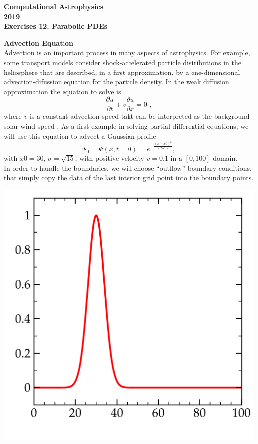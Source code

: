\documentclass[11pt]{article}
\begin{document}
\begin{center}
\large \bf Computational Astrophysics \rm \\
2019\\
{\small Exercises 12. Parabolic PDEs}
\end{center}

\textbf{Advection Equation} \\
Advection is an important process in many aspects of astrophysics. For example, some transport models consider shock-accelerated particle distributions in the heliosphere \cite{Litvinenko2014} that are described, in a first approximation, by a one-dimensional advection-difussion equation for the particle density. In the weak diffusion approximation the equation to solve is
\begin{equation}
\frac{\partial u}{\partial t} + v\frac{\partial u}{\partial x} = 0\,\,,
\end{equation}
where $v$ is a constant advection speed taht can be interpreted as the background solar wind speed \cite{Litvinenko2014}.
As a first example in solving partial differential equations, we will use this equation  to advect a Gaussian profile
\begin{equation}
 \Psi_0 = \Psi(x,t=0) = e^{-\frac{(x-x0)^2 }{(2 \sigma^2)}},
 \end{equation}
 with $x0 = 30$, $\sigma = \sqrt{15}$, with positive
velocity $v = 0.1$ in a $[0,100]$ domain.\\ 
In order to handle the boundaries, we will choose ``outflow'' boundary
conditions, that simply copy the data of the last interior grid point into the
boundary points.
\begin{center}
\vspace*{-0.4cm}
\begin{minipage}{0.4\textwidth}\includegraphics[width=1\textwidth]{gauss_advect_plot.pdf}
\end{minipage}
\vspace*{-0.5cm}
\end{center}
\renewcommand{\labelenumi}{(\arabic{enumi})}
\end{document}
